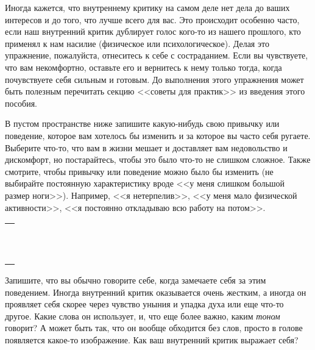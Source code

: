 Иногда кажется, что внутреннему критику на самом деле нет дела до ваших интересов и до того, что лучше всего для вас. Это происходит особенно часто, если наш внутренний критик дублирует голос кого-то из нашего прошлого, кто применял к нам насилие (физическое или психологическое). Делая это упражнение, пожалуйста, отнеситесь к себе с состраданием. Если вы чувствуете, что вам некомфортно, оставьте его и вернитесь к нему только тогда, когда почувствуете себя сильным и готовым. До выполнения этого упражнения может быть полезным перечитать секцию <<советы для практик>> из введения этого пособия.

\begin{itemize}
	\itemWritingHand В пустом пространстве ниже запишите какую-нибудь свою привычку или поведение, которое вам хотелось бы изменить и за которое вы часто себя ругаете. Выберите что-то, что вам в жизни мешает и доставляет вам недовольство и дискомфорт, но постарайтесь, чтобы это было что-то не слишком сложное. Также смотрите, чтобы привычку или поведение можно было бы изменить (не выбирайте постоянную характеристику вроде <<у меня слишком большой размер ноги>>). Например, <<я нетерпелив>>, <<у меня мало физической активности>>, <<я постоянно откладываю всю работу на потом>>.
\end{itemize}

\setlength{\extrarowheight}{2mm}
\begin{tabularx}{0.96\textwidth}{X}
	\\
	\arrayrulecolor{gray}\hline\\
	\hline\\
	\hline\\
	\hline\\
	\hline\\
	\hline\\	
	\hline\\
	\hline\\
	\hline\\
	\hline\\
	\hline\\
	\hline\\
\end{tabularx}
\setlength{\extrarowheight}{0mm}

\begin{itemize}
	\itemWritingHand Запишите, что вы обычно говорите себе, когда замечаете себя за этим поведением. Иногда внутренний критик оказывается очень жестким, а иногда он проявляет себя скорее через чувство уныния и упадка духа или еще что-то другое. Какие слова он использует, и, что еще более важно, каким \emph{тоном} говорит? А может быть так, что он вообще обходится без слов, просто в голове появляется какое-то изображение. Как ваш внутренний критик выражает себя? 
\end{itemize}

